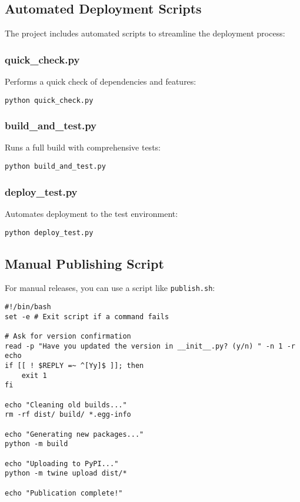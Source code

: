 \documentclass[11pt, a4paper]{article}
\begin{document}
\subsection{Automated Deployment Scripts}
The project includes automated scripts to streamline the deployment process:

\subsubsection{quick\_check.py}
Performs a quick check of dependencies and features:
\begin{lstlisting}[style=bashstyle]
python quick_check.py
\end{lstlisting}

\subsubsection{build\_and\_test.py}
Runs a full build with comprehensive tests:
\begin{lstlisting}[style=bashstyle]
python build_and_test.py
\end{lstlisting}

\subsubsection{deploy\_test.py}
Automates deployment to the test environment:
\begin{lstlisting}[style=bashstyle]
python deploy_test.py
\end{lstlisting}

\subsection{Manual Publishing Script}
For manual releases, you can use a script like \texttt{publish.sh}:
\begin{lstlisting}[style=bashstyle]
#!/bin/bash
set -e # Exit script if a command fails

# Ask for version confirmation
read -p "Have you updated the version in __init__.py? (y/n) " -n 1 -r
echo
if [[ ! $REPLY =~ ^[Yy]$ ]]; then
    exit 1
fi

echo "Cleaning old builds..."
rm -rf dist/ build/ *.egg-info

echo "Generating new packages..."
python -m build

echo "Uploading to PyPI..."
python -m twine upload dist/*

echo "Publication complete!"
\end{lstlisting}
\end{document}
